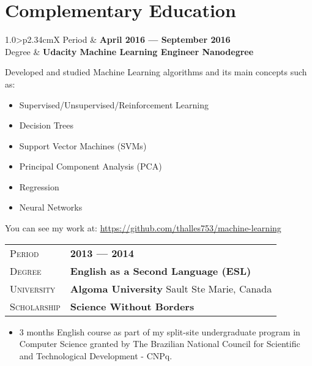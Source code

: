 \documentclass[10pt, a4paper, oneside, final]{scrartcl} %
\newcommand{\gray}{\rowcolor[gray]{.90}} %
\begin{document}

\section{Complementary Education}

\begin{center}
\begin{tabularx}{1.0\linewidth}{>{\raggedleft\scshape}p{2.34cm}X}
\gray Period & \textbf{April 2016 --- September 2016}\\
\gray Degree & \textbf{Udacity Machine Learning Engineer Nanodegree} \\
\end{tabularx}
\end{center}

Developed and studied Machine Learning algorithms  and its main concepts such as:

\begin{itemize}\itemsep1.5pt
\item Supervised/Unsupervised/Reinforcement Learning
\item Decision Trees
\item Support Vector Machines (SVMs)
\item  Principal Component Analysis (PCA)
\item  Regression
\item  Neural Networks
\end{itemize}

You can see my work at: \url{https://github.com/thalles753/machine-learning}

\begin{center}
\begin{tabularx}{1.0\linewidth}{>{\raggedleft\scshape}p{2.34cm}X}
\gray Period & \textbf{2013 --- 2014}\\
\gray Degree & \textbf{English as a Second Language (ESL)}\\
\gray University & \textbf{Algoma University} \hfill Sault Ste Marie, Canada\\
\gray Scholarship & \textbf{Science Without Borders}
\end{tabularx}
\end{center}

\begin{itemize}\itemsep1.5pt
\item 3 months English course as part of my split-site undergraduate program in Computer Science granted by The Brazilian National Council for Scientific and Technological Development - CNPq. 
\end{itemize}
\end{document}
